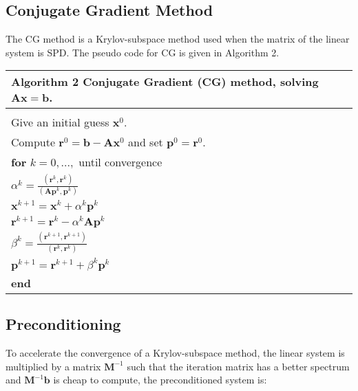 \documentclass[12pt]{article}
\begin{document}
\subsection*{Conjugate Gradient Method}
\hspace{0.5cm}The CG method is a Krylov-subspace method used when the matrix of the linear system is SPD. 
 The pseudo code for CG is given in Algorithm 2.\par
 \begin{table}[!h]
\begin{tabular}{ |l| } 
\hline
  \textbf{Algorithm 2} Conjugate Gradient (CG) method, solving $\mathbf{A}\mathbf{x}=\mathbf{b}$.\\
  \hline
 \hline
\\
Give an initial guess $\mathbf{x}^0$. \\Compute $\mathbf{r}^0=\mathbf{b}-\mathbf{A}\mathbf{x}^0$ and set $\mathbf{p}^0=\mathbf{r}^0$.\\

\hspace{0.5cm}\textbf{for} $k=0,...,$ until convergence\\
 \hspace{1cm} $\alpha^k=\frac{(\mathbf{r}^{k},\mathbf{r}^{k})}{(\mathbf{A}\mathbf{p}^k,\mathbf{p}^k)}$\\
\hspace{1cm} $\mathbf{x}^{k+1}=\mathbf{x}^k+\alpha^k\mathbf{p}^k$\\
\hspace{1cm}$\mathbf{r}^{k+1}=\mathbf{r}^k-\alpha^k\mathbf{A}\mathbf{p}^k$\\
\hspace{1cm}$ \beta^k=\frac{(\mathbf{r}^{k+1},\mathbf{r}^{k+1})}{(\mathbf{r}^k,\mathbf{r}^k)}$\\
\hspace{1cm}$\mathbf{p}^{k+1}=\mathbf{r}^{k+1}+\beta^k\mathbf{p}^k$\\
\hspace{0.5cm}\textbf{end}\\
\hline
\end{tabular}
\end{table}

\subsection*{Preconditioning}
\hspace{0.5cm}To accelerate the convergence of a Krylov-subspace method, the linear system is multiplied by a matrix $\mathbf{M}^{-1}$ such that the iteration matrix has a better spectrum and $\mathbf{M}^{-1}\mathbf{b}$ is cheap to compute, the preconditioned system is:
\end{document}
